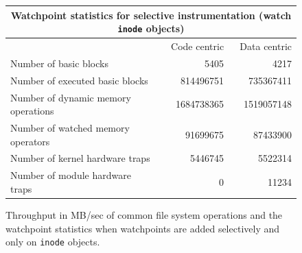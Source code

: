 \begin{figure}[!h]
\begin{center}
\vspace{1em}
\begin{tabular}{|l|r|r|}
  \hline
  \multicolumn{3}{|c|}{Watchpoint statistics for selective instrumentation (watch \texttt{inode} objects)}  \\ \hline
  \hline
  & Code centric & Data centric \\
  \hline
  Number of basic blocks & 5405 & 4217 \\
  \hline
  Number of executed basic blocks &  814496751  & 735367411 \\
  \hline
  Number of dynamic memory operations & 1684738365 & 1519057148\\
  \hline
  Number of watched memory operators & 91699675 & 87433900 \\
  \hline
  Number of kernel hardware traps & 5446745 & 5522314 \\
  \hline
  Number of module hardware traps & 0 & 11234 \\
  \hline
\end{tabular}
\caption[Performance impact of selective instrumentations. The watchpoints are added on all file \texttt{inode} objects.]{\label{fig:watchpoint_inode_compare} Throughput in MB/sec of common file system operations and the watchpoint statistics when watchpoints are added selectively and only on \texttt{inode} objects.}
\end{center}
\end{figure}



